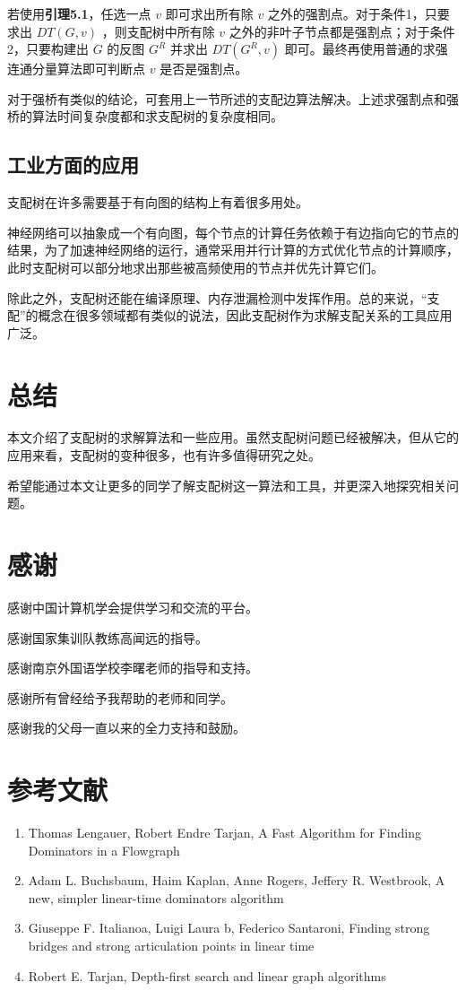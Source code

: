 \documentclass{noithesis}
\begin{document}
若使用\textbf{引理5.1}，任选一点 $v$ 即可求出所有除 $v$ 之外的强割点。对于条件1，只要求出 $DT(G, v)$ ，则支配树中所有除 $v$ 之外的非叶子节点都是强割点；对于条件2，只要构建出 $G$ 的反图 $G^R$ 并求出 $DT(G^R, v)$ 即可。最终再使用普通的求强连通分量算法即可判断点 $v$ 是否是强割点。

对于强桥有类似的结论，可套用上一节所述的支配边算法解决。上述求强割点和强桥的算法时间复杂度都和求支配树的复杂度相同。

\subsection{工业方面的应用}

支配树在许多需要基于有向图的结构上有着很多用处。

神经网络可以抽象成一个有向图，每个节点的计算任务依赖于有边指向它的节点的结果，为了加速神经网络的运行，通常采用并行计算的方式优化节点的计算顺序，此时支配树可以部分地求出那些被高频使用的节点并优先计算它们。

除此之外，支配树还能在编译原理、内存泄漏检测中发挥作用。总的来说，“支配”的概念在很多领域都有类似的说法，因此支配树作为求解支配关系的工具应用广泛。

\section{总结}

本文介绍了支配树的求解算法和一些应用。虽然支配树问题已经被解决，但从它的应用来看，支配树的变种很多，也有许多值得研究之处。

希望能通过本文让更多的同学了解支配树这一算法和工具，并更深入地探究相关问题。

\section*{感谢}

感谢中国计算机学会提供学习和交流的平台。

感谢国家集训队教练高闻远的指导。

感谢南京外国语学校李曙老师的指导和支持。

感谢所有曾经给予我帮助的老师和同学。

感谢我的父母一直以来的全力支持和鼓励。

\section*{参考文献}

\begin{enumerate}[\lbrack 1\rbrack]
	\item Thomas Lengauer, Robert Endre Tarjan, A Fast Algorithm for Finding Dominators in a Flowgraph 
	\item Adam L. Buchsbaum, Haim Kaplan, Anne Rogers, Jeffery R. Westbrook, A new, simpler linear-time dominators algorithm
	\item Giuseppe F. Italianoa, Luigi Laura b, Federico Santaroni, Finding strong bridges and strong articulation points in linear time
	\item Robert E. Tarjan,  Depth-first search and linear graph algorithms
\end{enumerate}
\end{document}
